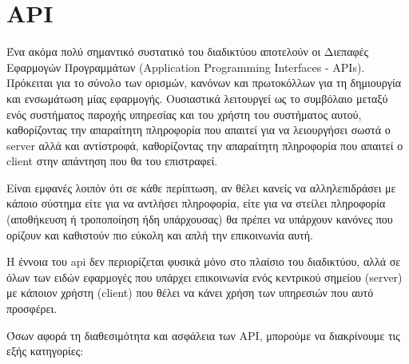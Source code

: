 \section{API}
\label{section:api}

Ένα ακόμα πολύ σημαντικό συστατικό του διαδικτύου αποτελούν οι Διεπαφές Εφαρμογών Προγραμμάτων (Application Programming Interfaces - APIs).
Πρόκειται για το σύνολο των ορισμών, κανόνων και πρωτοκόλλων για τη δημιουργία και ενσωμάτωση μίας
εφαρμογής. Ουσιαστικά λειτουργεί ως το συμβόλαιο μεταξύ ενός συστήματος παροχής υπηρεσίας και του
χρήστη του συστήματος αυτού, καθορίζοντας την απαραίτητη πληροφορία που απαιτεί για να λειουργήσει σωστά
ο server αλλά και αντίστροφά, καθορίζοντας την απαραίτητη πληροφορία που απαιτεί ο client στην απάντηση
που θα του επιστραφεί.

Είναι εμφανές λοιπόν ότι σε κάθε περίπτωση, αν θέλει κανείς να αλληλεπιδράσει με κάποιο σύστημα
είτε για να αντλήσει πληροφορία, είτε για να στείλει πληροφορία (αποθήκευση ή τροποποίηση ήδη υπάρχουσας)
θα πρέπει να υπάρχουν κανόνες που ορίζουν και καθιστούν πιο εύκολη και απλή την επικοινωνία αυτή.

H έννοια του api δεν περιορίζεται φυσικά μόνο στο πλαίσιο του διαδικτύου, αλλά σε όλων των ειδών
εφαρμογές που υπάρχει επικοινωνία ενός κεντρικού σημείου (server) με κάποιον χρήστη (client) που θέλει να
κάνει χρήση των υπηρεσιών που αυτό προσφέρει.

Όσων αφορά τη διαθεσιμότητα και ασφάλεια των API, μπορούμε να διακρίνουμε τις εξής κατηγορίες:

